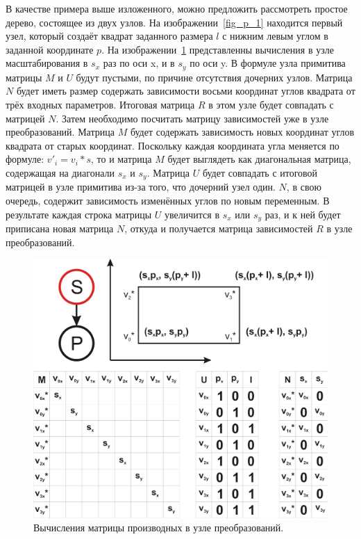 \documentclass[a4paper,hidelinks,12pt]{article}
\begin{document}
\par
В качестве примера выше изложенного, можно предложить рассмотреть простое дерево, состоящее из двух узлов. На изображении~\ref{fig_p_1} находится первый узел, который создаёт квадрат заданного размера $l$ с нижним левым углом в заданной координате $p$. На изображении~\ref{fig_p_2} представленны вычисления в узле масштабирования в $s_x$ раз по оси x, и в $s_y$ по оси y. В формуле узла примитива матрицы $M$ и $U$ будут пустыми, по причине отсутствия дочерних узлов. Матрица $N$ будет иметь размер содержать зависимости восьми координат углов квадрата от трёх входных параметров. Итоговая матрица $R$ в этом узле будет совпадать с матрицей $N$. Затем необходимо посчитать матрицу зависимостей уже в узле преобразований. Матрица $M$ будет содержать зависимость новых координат углов квадрата от старых координат. Поскольку каждая координата угла меняется по формуле: $v'_i=v_i*s$, то и матрица $M$ будет выглядеть как диагональная матрица, содержащая на диагонали $s_x$ и $s_y$. Матрица $U$ будет совпадать с итоговой матрицей в узле примитива из-за того, что дочерний узел один. $N$, в свою очередь, содержит зависимость изменённых углов по новым переменным. В результате каждая строка матрицы $U$ увеличится в $s_x$ или $s_y$ раз, и к ней будет приписана новая матрица $N$, откуда и получается матрица зависимостей $R$ в узле преобразований.

\begin{figure}[H]
\begin{center}
	\includegraphics[width=15 cm]{primer2.png}
	\caption{Вычисления матрицы производных в узле преобразований.}
 	\label{fig_p_2}
\end{center}
\end{figure}
\end{document}
